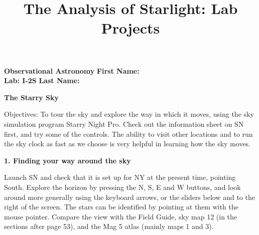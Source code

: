\documentclass[12pt]{article}
\title{The Analysis of Starlight: Lab Projects}
\begin{document}
\setcounter{page}{1}
\setcounter{equation}{0}
\pagestyle{plain}
\thispagestyle{empty}  %
\newcommand{\kms}{\hbox{km\,s$^{\rm -1}$}}
\def\lo {\ifmmode {\,{\it L}\solar} \else $\,L$\solar\fi}       %
\def\my {\ifmmode {\,{\it M}\solar\,{\rm yr^{-1}}}              %
        \else {$\,M$\solar$\,$yr$^{\rm -1}$}\fi}
\def\BD {BD$\,$+30{\degr}3639}
\def\HUNO{\rm H$\,$I}                   %
\def\HDOS{\rm H$_2$}                    %
\def\arcsec{\ifmmode {^{\scriptscriptstyle\prime\prime}}
          \else $^{\scriptscriptstyle\prime\prime}$\fi}
\def\arcminm{\ifmmode {^{\scriptscriptstyle\prime}}
          \else $^{\scriptscriptstyle\prime}$\fi}
\def\deg{\ifmmode^\circ\else$^\circ$\fi}







\noindent
{\bf Observational Astronomy    \hfill} {\bf First Name:\makebox[4cm]{\hrulefill}}\\
{\bf Lab: I-2S} \hfill {\bf Last Name:\makebox[4cm]{\hrulefill}}


\bigskip

\medskip

\noindent
{\hfill \Large {\bf The Starry Sky} \hfill}


\bigskip

\noindent
{Objectives:} To tour the sky and explore the way in which it moves,
using the sky simulation program Starry Night Pro. Check out the
information sheet on SN first, and try some of the controls. The
ability to visit other locations and to run the sky clock as fast as
we choose is very helpful in learning how the sky moves.

\bigskip
\noindent
{\bf 1. Finding your way around the sky}

\medskip
\noindent
Launch SN and check that it is set up for NY at the present time,
pointing South.  Explore the horizon by pressing the N, S, E and W
buttons, and look around more generally using the keyboard arrows, or
the sliders below and to the right of the screen. The stars can be
identified by pointing at them with the mouse pointer. Compare the
view with the Field Guide, sky map 12 (in the sections after page 53),
and the Mag 5 atlas (mainly maps 1 and 3).
\end{document}
